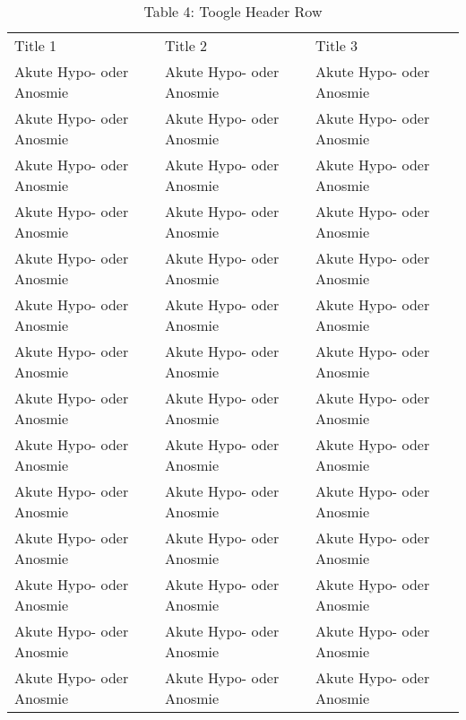 \documentclass{article}
\begin{document}
\begin{table}
\caption*{Table 4: Toogle Header Row}\label{T61102401}

\begin{tabu} to \textwidth { |X|X|X| }
\hline



Title 1 & Title 2 & Title 3
 \\


Akute Hypo- oder Anosmie & Akute Hypo- oder Anosmie & Akute Hypo- oder Anosmie
 \\


Akute Hypo- oder Anosmie & Akute Hypo- oder Anosmie & Akute Hypo- oder Anosmie
 \\


Akute Hypo- oder Anosmie & Akute Hypo- oder Anosmie & Akute Hypo- oder Anosmie
 \\


Akute Hypo- oder Anosmie & Akute Hypo- oder Anosmie & Akute Hypo- oder Anosmie
 \\


Akute Hypo- oder Anosmie & Akute Hypo- oder Anosmie & Akute Hypo- oder Anosmie
 \\


Akute Hypo- oder Anosmie & Akute Hypo- oder Anosmie & Akute Hypo- oder Anosmie
 \\


Akute Hypo- oder Anosmie & Akute Hypo- oder Anosmie & Akute Hypo- oder Anosmie
 \\


Akute Hypo- oder Anosmie & Akute Hypo- oder Anosmie & Akute Hypo- oder Anosmie
 \\


Akute Hypo- oder Anosmie & Akute Hypo- oder Anosmie & Akute Hypo- oder Anosmie
 \\


Akute Hypo- oder Anosmie & Akute Hypo- oder Anosmie & Akute Hypo- oder Anosmie
 \\


Akute Hypo- oder Anosmie & Akute Hypo- oder Anosmie & Akute Hypo- oder Anosmie
 \\


Akute Hypo- oder Anosmie & Akute Hypo- oder Anosmie & Akute Hypo- oder Anosmie
 \\


Akute Hypo- oder Anosmie & Akute Hypo- oder Anosmie & Akute Hypo- oder Anosmie
 \\


Akute Hypo- oder Anosmie & Akute Hypo- oder Anosmie & Akute Hypo- oder Anosmie
 \\



\end{tabu}
\end{table}
\end{document}
